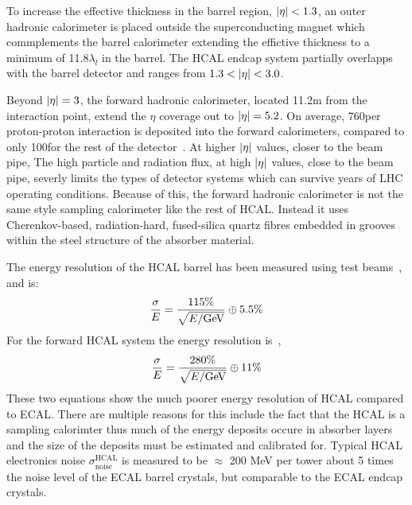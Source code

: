 To increase the effective
thickness in the barrel region, $\lvert\eta\rvert < 1.3$, an outer hadronic calorimeter is placed 
outside the superconducting magnet which commplements the barrel calorimeter
extending the effictive thickness to a minimum of 11.8$\lambda_{l}$ in the barrel. 
The HCAL endcap system partially overlapps with the barrel detector and ranges from
$1.3 < \lvert\eta\rvert < 3.0$.

Beyond $\lvert\eta\rvert = 3$, the forward hadronic calorimeter, located
11.2m from the interaction point, extend the $\eta$ coverage out to $\lvert\eta\rvert = 5.2$.
On average, 760\GeV per proton-proton interaction is deposited into the forward 
calorimeters, compared to only 100\GeV for the rest of the detector~\cite{Chatrchyan:2008zzk}.
At higher $\lvert\eta\rvert$ values, closer to the beam pipe, 
The high particle and radiation flux, at high $\lvert\eta\rvert$ values, close to the beam pipe,
severly limits the types of detector systems which can survive years of LHC operating
conditions. Because of this, the forward hadronic calorimeter is not the same style sampling
calorimeter like the rest of HCAL. Instead it uses Cherenkov-based, 
radiation-hard, fused-silica quartz fibres embedded in grooves within the steel structure
of the absorber material.

The energy resolution of the HCAL barrel has been measured using test beams~\cite{Elvira:800406}, and is:
\begin{equation}
\label{eqn:hcal_res}
\frac{\sigma}{E} = \frac{115\%}{\sqrt{E/\mathrm{GeV}}} \oplus 5.5\%
\end{equation}
For the forward HCAL system the energy resolution is~\cite{Baiatian:951395},
\begin{equation}
\label{eqn:hcal_res}
\frac{\sigma}{E} = \frac{280\%}{\sqrt{E/\mathrm{GeV}}} \oplus 11\%
\end{equation}
These two equations show the much poorer energy resolution of HCAL compared to ECAL.
There are multiple reasons for this include the fact that the HCAL is a sampling 
calorimter thus much of the energy deposits occure in absorber layers and the 
size of the deposits must be estimated and calibrated for.
Typical HCAL electronics noise $\sigma ^{\text{HCAL}} _{\text{noise}}$ 
is measured to be $\approx$ 200 MeV per tower about 5 times the noise level of
the ECAL barrel crystals, but comparable to the ECAL endcap crystals.

